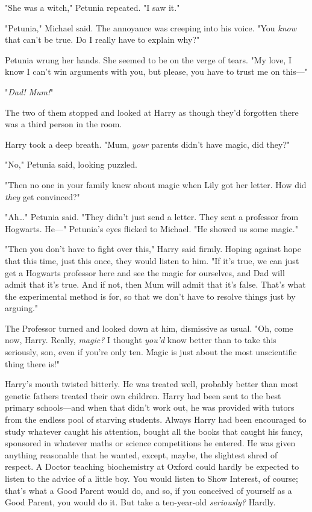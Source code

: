 "She was a witch," Petunia repeated. "I saw it."

"Petunia," Michael said. The annoyance was creeping into his voice. "You
\emph{know} that can't be true. Do I really have to explain why?"

Petunia wrung her hands. She seemed to be on the verge of tears. "My love, I
know I can't win arguments with you, but please, you have to trust me on
this---"

"\emph{Dad! Mum!}"

The two of them stopped and looked at Harry as though they'd forgotten there
was a third person in the room.

Harry took a deep breath. "Mum, \emph{your} parents didn't have magic, did
they?"

"No," Petunia said, looking puzzled.

"Then no one in your family knew about magic when Lily got her letter. How did
\emph{they} get convinced?"

"Ah{\ldots}" Petunia said. "They didn't just send a letter. They sent a
professor from Hogwarts. He---" Petunia's eyes flicked to Michael. "He showed
us some magic."

"Then you don't have to fight over this," Harry said firmly. Hoping against
hope that this time, just this once, they would listen to him. "If it's true,
we can just get a Hogwarts professor here and see the magic for ourselves, and
Dad will admit that it's true. And if not, then Mum will admit that it's false.
That's what the experimental method is for, so that we don't have to resolve
things just by arguing."

The Professor turned and looked down at him, dismissive as usual. "Oh, come
now, Harry. Really, \emph{magic?} I thought \emph{you'd} know better than to
take this seriously, son, even if you're only ten. Magic is just about the most
unscientific thing there is!"

Harry's mouth twisted bitterly. He was treated well, probably better than most
genetic fathers treated their own children. Harry had been sent to the best
primary schools---and when that didn't work out, he was provided with tutors
from the endless pool of starving students. Always Harry had been encouraged to
study whatever caught his attention, bought all the books that caught his
fancy, sponsored in whatever maths or science competitions he entered. He was
given anything reasonable that he wanted, except, maybe, the slightest shred of
respect. A Doctor teaching biochemistry at Oxford could hardly be expected to
listen to the advice of a little boy. You would listen to Show Interest, of
course; that's what a Good Parent would do, and so, if you conceived of
yourself as a Good Parent, you would do it. But take a ten-year-old
\emph{seriously?} Hardly.

